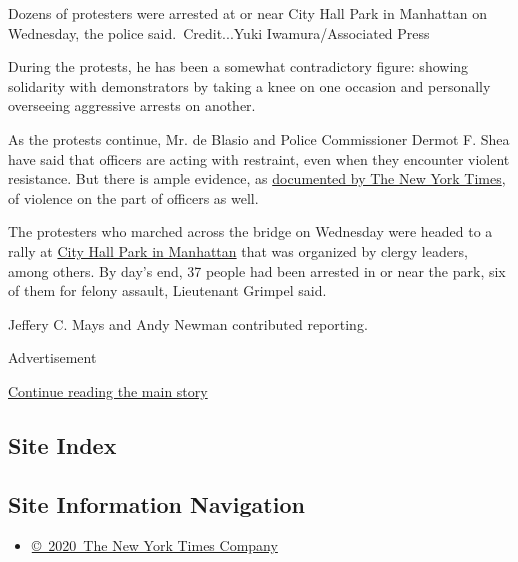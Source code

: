 Dozens of protesters were arrested at or near City Hall Park in
Manhattan on Wednesday, the police said.~Credit...Yuki
Iwamura/Associated Press

During the protests, he has been a somewhat contradictory figure:
showing solidarity with demonstrators by taking a knee on one occasion
and personally overseeing aggressive arrests on another.

As the protests continue, Mr. de Blasio and Police Commissioner Dermot
F. Shea have said that officers are acting with restraint, even when
they encounter violent resistance. But there is ample evidence, as
\href{https://www.nytimes3xbfgragh.onion/interactive/2020/07/14/nyregion/nypd-george-floyd-protests.html}{documented
by The New York Times}, of violence on the part of officers as well.

The protesters who marched across the bridge on Wednesday were headed to
a rally at
\href{https://www.nytimes3xbfgragh.onion/2020/07/22/nyregion/occupy-city-hall-protest-nypd.html}{City
Hall Park in Manhattan} that was organized by clergy leaders, among
others. By day's end, 37 people had been arrested in or near the park,
six of them for felony assault, Lieutenant Grimpel said.

Jeffery C. Mays and Andy Newman contributed reporting.

Advertisement

\protect\hyperlink{after-bottom}{Continue reading the main story}

\hypertarget{site-index}{%
\subsection{Site Index}\label{site-index}}

\hypertarget{site-information-navigation}{%
\subsection{Site Information
Navigation}\label{site-information-navigation}}

\begin{itemize}
\tightlist
\item
  \href{https://help.nytimes3xbfgragh.onion/hc/en-us/articles/115014792127-Copyright-notice}{©~2020~The
  New York Times Company}
\end{itemize}

